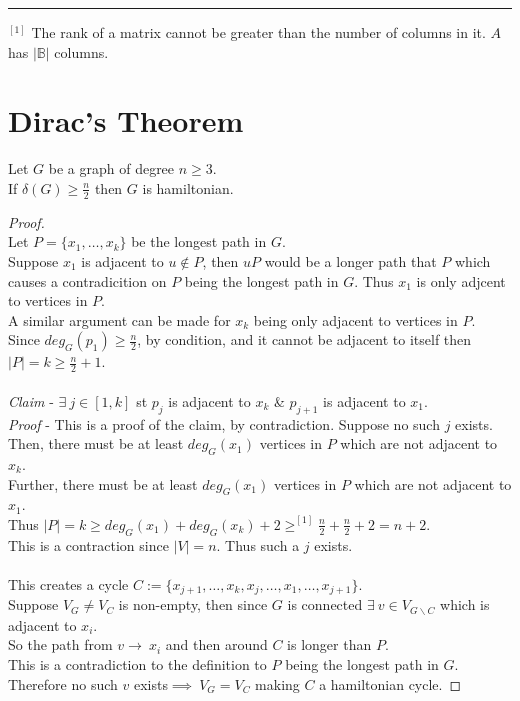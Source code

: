 \documentclass[11pt,a4paper]{article}
\begin{document}
\par\noindent\rule{\textwidth}{0.4pt}

$^{[1]}$ The rank of a matrix cannot be greater than the number of columns in it. $A$ has $|\mathbb{B}|$ columns.

\newpage
\section*{Dirac's Theorem}
Let $G$ be a graph of degree $n\geq3$.\\
If $\delta(G)\geq\frac{n}{2}$ then $G$ is hamiltonian.

\begin{proof}\hfill\\
Let $P=\{x_1,\dots,x_k\}$ be the longest path in $G$.\\
Suppose $x_1$ is adjacent to $u\not\in P$, then $uP$ would be a longer path that $P$ which causes a contradicition on $P$ being the longest path in $G$. Thus $x_1$ is only adjcent to vertices in $P$.\\
A similar argument can be made for $x_k$ being only adjacent to vertices in $P$.\\
Since $deg_G(p_1)\geq\frac{n}{2}$, by condition, and it cannot be adjacent to itself then $|P|=k\geq\frac{n}{2}+1$.\\
\\
\textit{Claim} - $\exists\ j\in[1,k]$ st $p_j$ is adjacent to $x_k$ \& $p_{j+1}$ is adjacent to $x_1$.\\
\textit{Proof} - This is a proof of the claim, by contradiction. Suppose no such $j$ exists.\\
Then, there must be at least $deg_G(x_1)$ vertices in $P$ which are not adjacent to $x_k$.\\
Further, there must be at least $deg_G(x_1)$ vertices in $P$ which are not adjacent to $x_1$.\\
Thus $|P|=k\geq deg_G(x_1)+deg_G(x_k)+2\geq^{[1]}\frac{n}{2}+\frac{n}{2}+2=n+2$.\\
This is a contraction since $|V|=n$. Thus such a $j$ exists.\\
\\
This creates a cycle $C:=\{x_{j+1},\dots,x_k,x_j,\dots,x_1,\dots,x_{j+1}\}$.\\
Suppose $V_G\neq V_C$ is non-empty, then since $G$ is connected $\exists\ v\in V_{G\backslash C}$ which is adjacent to $x_i$.\\
So the path from $v\to\ x_i$ and then around $C$ is longer than $P$.\\
This is a contradiction to the definition to $P$ being the longest path in $G$.\\
Therefore no such $v$ exists$\implies\ V_G=V_C$ making $C$ a hamiltonian cycle.
\end{proof}
\end{document}

